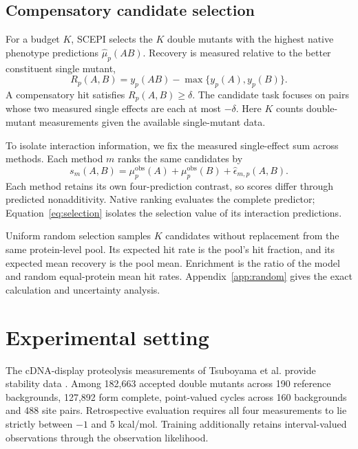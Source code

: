 \documentclass{llncs}
\begin{document}
\subsection{Compensatory candidate selection}

For a budget $K$, SCEPI selects the $K$ double mutants with the highest native phenotype predictions $\widehat\mu_p(AB)$. Recovery is measured relative to the better constituent single mutant,
\begin{equation}
R_p(A,B)=y_p(AB)-\max\{y_p(A),y_p(B)\}.
\end{equation}
A compensatory hit satisfies $R_p(A,B)\geq\delta$. The candidate task focuses on pairs whose two measured single effects are each at most $-\delta$. Here $K$ counts double-mutant measurements given the available single-mutant data.

To isolate interaction information, we fix the measured single-effect sum across methods. Each method $m$ ranks the same candidates by
\begin{equation}
s_m(A,B)=\mu_p^{\mathrm{obs}}(A)+\mu_p^{\mathrm{obs}}(B)+\widehat\epsilon_{m,p}(A,B).
\label{eq:selection}
\end{equation}
Each method retains its own four-prediction contrast, so scores differ through predicted nonadditivity. Native ranking evaluates the complete predictor; Equation~\eqref{eq:selection} isolates the selection value of its interaction predictions.

Uniform random selection samples $K$ candidates without replacement from the same protein-level pool. Its expected hit rate is the pool's hit fraction, and its expected mean recovery is the pool mean. Enrichment is the ratio of the model and random equal-protein mean hit rates. Appendix~\ref{app:random} gives the exact calculation and uncertainty analysis.

\section{Experimental setting}

The cDNA-display proteolysis measurements of Tsuboyama et al. provide stability data \citep{tsuboyama2023}. Among 182,663 accepted double mutants across 190 reference backgrounds, 127,892 form complete, point-valued cycles across 160 backgrounds and 488 site pairs. Retrospective evaluation requires all four measurements to lie strictly between $-1$ and 5 kcal/mol. Training additionally retains interval-valued observations through the observation likelihood.
\end{document}
